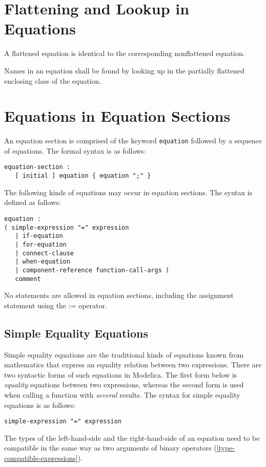\section{Flattening and Lookup in Equations}\label{flattening-and-lookup-in-equations}

A flattened equation is identical to the corresponding nonflattened
equation.

Names in an equation shall be found by looking up in the partially
flattened enclosing class of the equation.

\section{Equations in Equation Sections}\label{equations-in-equation-sections}

An equation section is comprised of the keyword \lstinline!equation! followed by a sequence of equations.
The formal syntax is as follows:
\begin{lstlisting}[language=grammar]
equation-section :
   [ initial ] equation { equation ";" }
\end{lstlisting}

The following kinds of equations may occur in equation sections. The
syntax is defined as follows:
\begin{lstlisting}[language=grammar]
equation :
( simple-expression "=" expression
   | if-equation
   | for-equation
   | connect-clause
   | when-equation
   | component-reference function-call-args )
   comment
\end{lstlisting}
No statements are allowed in equation sections, including the assignment
statement using the := operator.

\subsection{Simple Equality Equations}\label{simple-equality-equations}

Simple equality equations are the traditional kinds of equations known
from mathematics that express an equality relation between two
expressions. There are two syntactic forms of such equations in
Modelica. The first form below is \emph{equality} equations between two
expressions, whereas the second form is used when calling a function
with \emph{several} results. The syntax for simple equality equations is
as follows:
\begin{lstlisting}[language=grammar]
simple-expression "=" expression
\end{lstlisting}
The types of the left-hand-side and the right-hand-side of an equation
need to be compatible in the same way as two arguments of binary
operators (\cref{type-compatible-expressions}).

